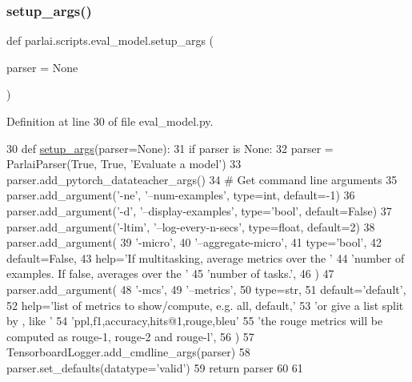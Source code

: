 \subsubsection{\texorpdfstring{setup\+\_\+args()}{setup\_args()}}
{\footnotesize\ttfamily def parlai.\+scripts.\+eval\+\_\+model.\+setup\+\_\+args (\begin{DoxyParamCaption}\item[{}]{parser = {\ttfamily None} }\end{DoxyParamCaption})}



Definition at line 30 of file eval\+\_\+model.\+py.


\begin{DoxyCode}
30 \textcolor{keyword}{def }\hyperlink{namespaceparlai_1_1scripts_1_1eval__model_a2eaba0aa76c4d83e2a0f7f77c23479c8}{setup\_args}(parser=None):
31     \textcolor{keywordflow}{if} parser \textcolor{keywordflow}{is} \textcolor{keywordtype}{None}:
32         parser = ParlaiParser(\textcolor{keyword}{True}, \textcolor{keyword}{True}, \textcolor{stringliteral}{'Evaluate a model'})
33     parser.add\_pytorch\_datateacher\_args()
34     \textcolor{comment}{# Get command line arguments}
35     parser.add\_argument(\textcolor{stringliteral}{'-ne'}, \textcolor{stringliteral}{'--num-examples'}, type=int, default=-1)
36     parser.add\_argument(\textcolor{stringliteral}{'-d'}, \textcolor{stringliteral}{'--display-examples'}, type=\textcolor{stringliteral}{'bool'}, default=\textcolor{keyword}{False})
37     parser.add\_argument(\textcolor{stringliteral}{'-ltim'}, \textcolor{stringliteral}{'--log-every-n-secs'}, type=float, default=2)
38     parser.add\_argument(
39         \textcolor{stringliteral}{'-micro'},
40         \textcolor{stringliteral}{'--aggregate-micro'},
41         type=\textcolor{stringliteral}{'bool'},
42         default=\textcolor{keyword}{False},
43         help=\textcolor{stringliteral}{'If multitasking, average metrics over the '}
44         \textcolor{stringliteral}{'number of examples. If false, averages over the '}
45         \textcolor{stringliteral}{'number of tasks.'},
46     )
47     parser.add\_argument(
48         \textcolor{stringliteral}{'-mcs'},
49         \textcolor{stringliteral}{'--metrics'},
50         type=str,
51         default=\textcolor{stringliteral}{'default'},
52         help=\textcolor{stringliteral}{'list of metrics to show/compute, e.g. all, default,'}
53         \textcolor{stringliteral}{'or give a list split by , like '}
54         \textcolor{stringliteral}{'ppl,f1,accuracy,hits@1,rouge,bleu'}
55         \textcolor{stringliteral}{'the rouge metrics will be computed as rouge-1, rouge-2 and rouge-l'},
56     )
57     TensorboardLogger.add\_cmdline\_args(parser)
58     parser.set\_defaults(datatype=\textcolor{stringliteral}{'valid'})
59     \textcolor{keywordflow}{return} parser
60 
61 
\end{DoxyCode}


